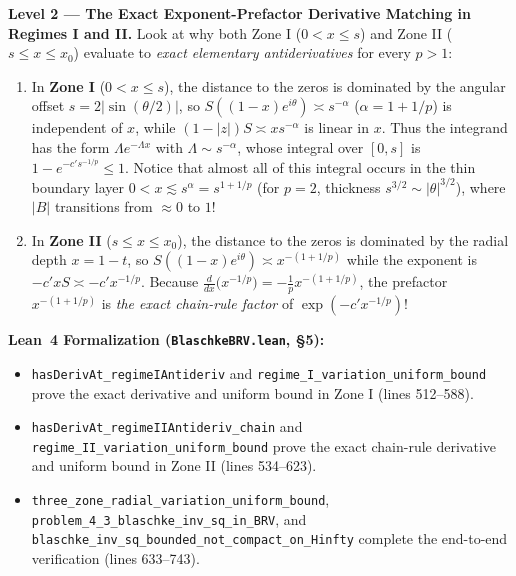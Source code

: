 \documentclass[11pt,reqno]{amsart}
\numberwithin{equation}{section}
\begin{document}
\begin{leveltwo}
\noindent\textbf{\textcolor{l2border}{Level 2 --- The Exact Exponent-Prefactor Derivative Matching in Regimes I and II.}}
Look at why both Zone I ($0 < x \le s$) and Zone II ($s \le x \le x_0$) evaluate to \emph{exact elementary antiderivatives} for every $p > 1$:
\begin{enumerate}
\item In \textbf{Zone I} ($0 < x \le s$), the distance to the zeros is dominated by the angular offset $s = 2|\sin(\theta/2)|$, so $S((1-x)e^{i\theta}) \asymp s^{-\alpha}$ ($\alpha = 1 + 1/p$) is independent of $x$, while $(1 - |z|) S \asymp x s^{-\alpha}$ is linear in $x$. Thus the integrand has the form $\Lambda e^{-\Lambda x}$ with $\Lambda \sim s^{-\alpha}$, whose integral over $[0, s]$ is $1 - e^{-c' s^{-1/p}} \le 1$. Notice that almost all of this integral occurs in the thin boundary layer $0 < x \lesssim s^{\alpha} = s^{1 + 1/p}$ (for $p = 2$, thickness $s^{3/2} \sim |\theta|^{3/2}$), where $|B|$ transitions from $\approx 0$ to $1$!
\item In \textbf{Zone II} ($s \le x \le x_0$), the distance to the zeros is dominated by the radial depth $x = 1 - t$, so $S((1-x)e^{i\theta}) \asymp x^{-(1 + 1/p)}$ while the exponent is $-c' x S \asymp -c' x^{-1/p}$. Because $\frac{d}{dx}\bigl(x^{-1/p}\bigr) = -\frac{1}{p} x^{-(1 + 1/p)}$, the prefactor $x^{-(1 + 1/p)}$ is \emph{the exact chain-rule factor} of $\exp(-c' x^{-1/p})$!
\end{enumerate}

\smallskip
\noindent\textbf{\textcolor{leannote}{Lean~4 Formalization (\texttt{BlaschkeBRV.lean}, \S 5):}}
\begin{itemize}
\item \texttt{hasDerivAt\_regimeIAntideriv} and \texttt{regime\_I\_variation\_uniform\_bound} prove the exact derivative and uniform bound in Zone I (lines 512--588).
\item \texttt{hasDerivAt\_regimeIIAntideriv\_chain} and \texttt{regime\_II\_variation\_uniform\_bound} prove the exact chain-rule derivative and uniform bound in Zone II (lines 534--623).
\item \texttt{three\_zone\_radial\_variation\_uniform\_bound}, \texttt{problem\_4\_3\_blaschke\_inv\_sq\_in\_BRV}, and \texttt{blaschke\_inv\_sq\_bounded\_not\_compact\_on\_Hinfty} complete the end-to-end verification (lines 633--743).
\end{itemize}
\end{leveltwo}
\end{document}
